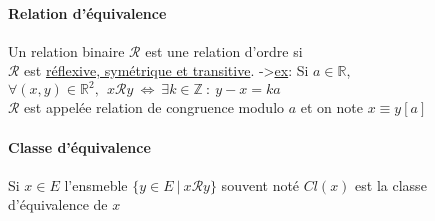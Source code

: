 		\paragraph{Relation d'équivalence}
			Un relation binaire $\mathcal{R}$ est une relation d'ordre si \\ $\mathcal{R}$ est \underline{réflexive, symétrique et transitive}.
			\trait
		->\underline{ex}: Si $a\in \mathbb{R}$, $\forall (x,y) \in \mathbb{R}^2 ,~~ x\mathcal{R} y ~\Leftrightarrow ~\exists k\in \mathbb{Z} ~:~
		y-x = ka$ \\ $\mathcal{R}$ est appelée relation de congruence modulo $a$ et on note $x \equiv y [a]$
		\traitd
		\paragraph{Classe d'équivalence} 
			Si $x\in E$ l'ensmeble $\{y\in E ~\vert ~x\mathcal{R} y\}$ souvent noté $Cl(x)$ est la classe d'équivalence de $x$ \trait
		\vspace*{0.5cm} \\ 
		\begin{center}
		\fin
		\end{center}